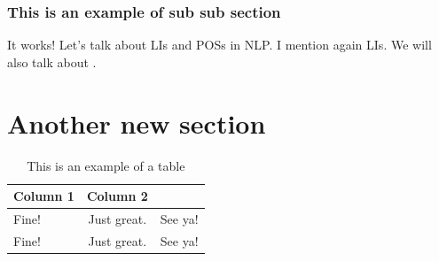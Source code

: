 \subsubsection{This is an example of sub sub section}
It works! Let's talk about \acp{LI} and \acp{POS} in \ac{NLP}. I mention again \acp{LI}. We will also talk about .

\section{Another new section}
\lipsum[5-6]

\begin{table}[hbt!]
\caption{This is an example of a table}
\centering
\begin{tabular}{ l c r }
\hline
Column 1 & Column 2\\ \hline
Fine! & Just great. & See ya!\\
Fine! & Just great. & See ya!\\
\hline
\end{tabular}
\end{table}